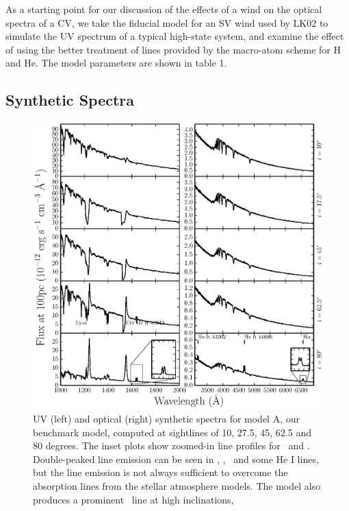 \documentclass[preprint, a4paper, 11pt]{aastex}
\begin{document}
{As a starting point for our discussion of the effects of a wind on the optical spectra of a CV, we 
take the fiducial model for an SV wind used by LK02 to simulate the UV spectrum of a typical high-state system,
and examine the effect of using the better treatment of lines provided
by the macro-atom scheme for H and He.
The model parameters are shown in table 1. 

\subsection{Synthetic Spectra}

\begin{figure} %
\includegraphics[width=\textwidth]{figures/fig5_uv_opt.eps}
\caption{
UV (left) and optical (right) synthetic spectra for model A, our benchmark model,
computed at sightlines of 10, 27.5, 45, 62.5 and 80 degrees.	
The inset plots show zoomed-in line profiles for 
\heiiuv\ and \ha. Double-peaked line emission can be seen in 
\heiiuv, \heiiopt, \ha\ and some He I lines, but the 
line emission is not always sufficient to overcome the absorption
lines from the stellar atmosphere models. The model
also produces a prominent \heiioptnew\ line at high inclinations,
}
\label{spec}
\end{figure} %

}
\end{document}
